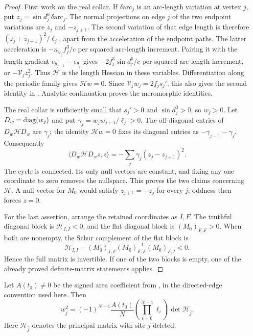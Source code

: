 \begin{proof}
First work on the real collar.  If \(\delta\mathrm{arc}_j\) is an arc-length
variation at vertex \(j\), put
\(z_j=\sin d_j^0\,\delta\mathrm{arc}_j\).  The normal projections on edge
\(j\) of the two endpoint variations are \(z_j\) and \(-z_{j+1}\).
The second variation of that edge length is therefore
\((z_j+z_{j+1})^2/\ell_j\), apart from the acceleration of the endpoint
paths.  The latter acceleration is
\(-n_{\psi_j}f_j^3/c\) per squared arc-length increment.  Pairing it with
the length gradient \(e_{\theta_{j-1}}-e_{\theta_j}\) gives
\(-2f_j^3\sin d_j^0/c\) per squared arc-length increment, or
\(-\mathcal V_j z_j^2\).  Thus \(\mathcal H\) is the length Hessian in
these variables.  Differentiation along the periodic family gives
\(\mathcal H w=0\).  Since \(\mathcal V_jw_j=2f_js_j'\), this also gives
the second identity in .  Analytic continuation
proves the meromorphic identities.

The real collar is sufficiently small that \(s_j'>0\) and
\(\sin d_j^0>0\), so \(w_j>0\).  Let \(D_w=\operatorname{diag}(w_j)\) and put
\(\gamma_j=w_jw_{j+1}/\ell_j>0\).  The off-diagonal entries of
\(D_w\mathcal H D_w\) are \(\gamma_j\); the identity
\(\mathcal Hw=0\) fixes its diagonal entries as
\(-\gamma_{j-1}-\gamma_j\).  Consequently
\[
 \langle D_w\mathcal H D_w z,z\rangle
   =-\sum_j\gamma_j(z_j-z_{j+1})^2.
\]
The cycle is connected.  Its only null vectors are constant, and fixing
any one coordinate to zero removes the nullspace.  This proves the two
claims concerning \(\mathcal H\).  A null vector for \(M_0\) would satisfy
\(z_{j+1}=-z_j\) for every \(j\); oddness then forces \(z=0\).

For the last assertion, arrange the retained coordinates as \(I,F\).
The truthful diagonal block is \(\mathcal H_{I,I}<0\), and the flat
diagonal block is \((M_0)_{F,F}>0\).  When both are nonempty, the Schur
complement of the flat block is
\[
 \mathcal H_{I,I}
 -(M_0)_{I,F}(M_0)_{F,F}^{-1}(M_0)_{F,I}<0.
\]
Hence the full matrix is invertible.  If one of the two blocks is empty,
one of the already proved definite-matrix statements applies.
\end{proof}

\begin{lemma}
\label{odd:cofactor-normalization}
Let \(A(t_0)\ne0\) be the signed area coefficient from
, in the directed-edge convention used here.
Then
\begin{equation}
 w_j^2=(-1)^{N-1}\frac{A(t_0)}{N}
       \left(\prod_{i=0}^{N-1}\ell_i\right)
       \det\mathcal H_{\widehat j}.
 \label{eq:cofactor}
\end{equation}
Here \(\mathcal H_{\widehat j}\) denotes the principal matrix with site
\(j\) deleted.
\end{lemma}

